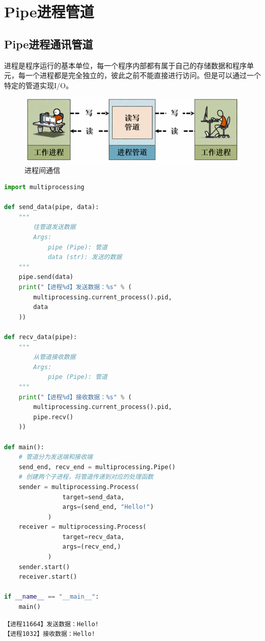 \newpage

\section{Pipe进程管道}

\subsection{Pipe进程通讯管道}

进程是程序运行的基本单位，每一个程序内部都有属于自己的存储数据和程序单元，每一个进程都是完全独立的，彼此之前不能直接进行访问。但是可以通过一个特定的管道实现I/O。

\begin{figure}[H]
	\centering
	\includegraphics[]{img/C11/11-4/1.png}
	\caption{进程间通信}
\end{figure}


\begin{lstlisting}[language=Python]
import multiprocessing

def send_data(pipe, data):
	"""
		往管道发送数据
		Args:
			pipe (Pipe): 管道
			data (str): 发送的数据
	"""
	pipe.send(data)
	print("【进程%d】发送数据：%s" % (
		multiprocessing.current_process().pid,
		data
	))

def recv_data(pipe):
	"""
		从管道接收数据
		Args:
			pipe (Pipe): 管道
	"""
	print("【进程%d】接收数据：%s" % (
		multiprocessing.current_process().pid, 
		pipe.recv()
	))

def main():
	# 管道分为发送端和接收端
	send_end, recv_end = multiprocessing.Pipe()
	# 创建两个子进程，将管道传递到对应的处理函数
	sender = multiprocessing.Process(
				target=send_data,
				args=(send_end, "Hello!")
			)
	receiver = multiprocessing.Process(
				target=recv_data,
				args=(recv_end,)
			)
	sender.start()
	receiver.start()

if __name__ == "__main__":
	main()
\end{lstlisting}

\begin{tcolorbox}
	\begin{verbatim}
【进程11664】发送数据：Hello!
【进程1032】接收数据：Hello!
\end{verbatim}
\end{tcolorbox}

